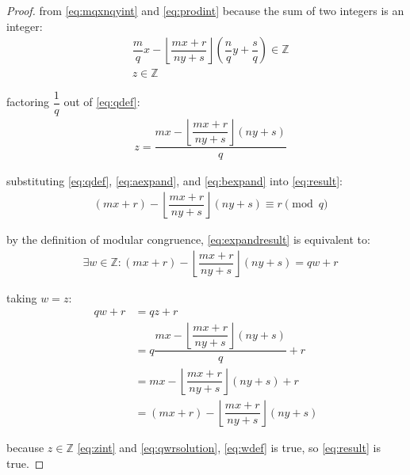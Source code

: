 \documentclass{article}
\begin{document}
\begin{proof}
from \eqref{eq:mqxnqyint} and \eqref{eq:prodint} because the sum of two integers is an integer:
\begin{align}
  &\dfrac{{m}}{{q}}{x} - \left\lfloor\dfrac{{m}{x} + {r}}{{n}{y} + {s}}\right\rfloor\left(\dfrac{{n}}{{q}}{y} + \dfrac{{s}}{{q}}\right) \in \mathbb{Z} \\
  &{z} \in \mathbb{Z} \label{eq:zint}
\end{align}

factoring $\dfrac{1}{{q}}$ out of \eqref{eq:qdef}:
\begin{align}
  &{z} = \dfrac{{m}{x} - \left\lfloor\dfrac{{m}{x} + {r}}{{n}{y} + {s}}\right\rfloor\left({n}{y} + {s}\right)}{{q}}
\end{align}


substituting \eqref{eq:qdef}, \eqref{eq:aexpand}, and \eqref{eq:bexpand} into \eqref{eq:result}:
\begin{align}
  &({m}{x} + {r}) - \left\lfloor\dfrac{{m}{x} + {r}}{{n}{y} + {s}}\right\rfloor({n}{y} + {s}) \equiv {r} \pmod{q} \label{eq:expandresult}
\end{align}

by the definition of modular congruence, \eqref{eq:expandresult} is
equivalent to:
\begin{align}
  &\exists {w} \in \mathbb{Z} : ({m}{x} + {r}) - \left\lfloor\dfrac{{m}{x} + {r}}{{n}{y} + {s}}\right\rfloor({n}{y} + {s}) = {q}{w} + {r} \label{eq:wdef}
\end{align}

taking $w = z$:
\begin{align}
  {q}{w} + {r} &= {q}{z} + {r} \\
               &= {q}\dfrac{{m}{x} - \left\lfloor\dfrac{{m}{x} + {r}}{{n}{y} + {s}}\right\rfloor\left({n}{y} + {s}\right)}{{q}} + {r} \\
               &= {m}{x} - \left\lfloor\dfrac{{m}{x} + {r}}{{n}{y} + {s}}\right\rfloor\left({n}{y} + {s}\right) + {r} \\
               &= ({m}{x} + {r}) - \left\lfloor\dfrac{{m}{x} + {r}}{{n}{y} + {s}}\right\rfloor({n}{y} + {s}) \label{eq:qwrsolution}
\end{align}

because $z \in \mathbb{Z}$ \eqref{eq:zint} and \eqref{eq:qwrsolution}, \eqref{eq:wdef} is true, so \eqref{eq:result} is true.

\end{proof}
\end{document}
